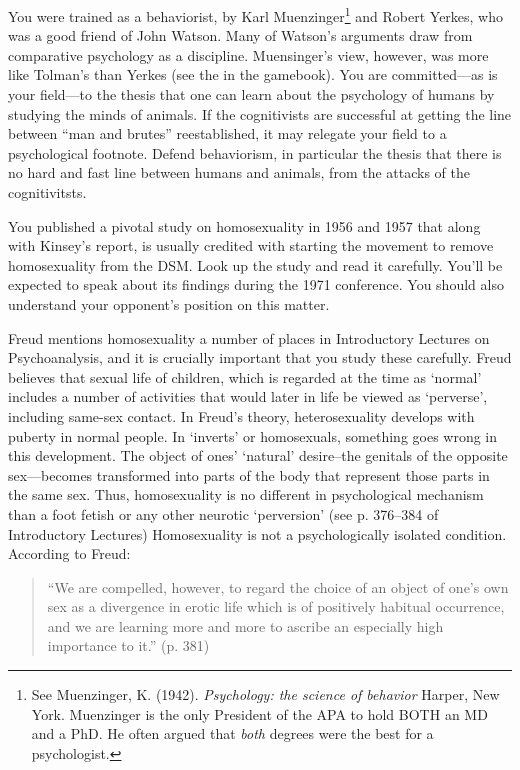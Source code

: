 \begin{refsection}
You were trained as a behaviorist, by Karl Muenzinger\footnote{See Muenzinger, K. (1942). \emph{Psychology: the science of behavior} Harper, New York. Muenzinger is the only President of the APA to hold BOTH an MD and a PhD. He often argued that \emph{both} degrees were the best for a psychologist.} and Robert Yerkes, who was a good friend of John Watson. Many of Watson's arguments draw from comparative psychology as a discipline. Muensinger's view, however, was more like Tolman's than Yerkes (see the  in the gamebook). You are committed—as is your field—to the thesis that one can learn about the psychology of humans by studying the minds of animals. If the cognitivists are successful at getting the line between “man and brutes” reestablished, it may relegate your field to a psychological footnote. Defend behaviorism, in particular the thesis that there is no hard and fast line between humans and animals, from the attacks of the cognitivitsts.

You published a pivotal study on homosexuality in 1956 and 1957 that along with Kinsey's report, is usually credited with starting the movement to remove homosexuality from the DSM. Look up the study and read it carefully. You'll be expected to speak about its findings during the 1971 conference. You should also understand your opponent's position on this matter.

Freud mentions homosexuality a number of places in Introductory Lectures on Psychoanalysis, and it is crucially important that you study these carefully. Freud believes that sexual life of children, which is regarded at the time as `normal' includes a number of activities that would later in life be viewed as `perverse', including same-sex contact. In Freud's theory, heterosexuality develops with puberty in normal people. In `inverts' or homosexuals, something goes wrong in this development. The object of ones' `natural' desire--the genitals of the opposite sex—becomes transformed into parts of the body that represent those parts in the same sex. Thus, homosexuality is no different in psychological mechanism than a foot fetish or any other neurotic `perversion' (see p. 376--384 of Introductory Lectures) Homosexuality is not a psychologically isolated condition. According to Freud:

\begin{quote}

“We are compelled, however, to regard the choice of an object of one's own sex as a divergence in erotic life which is of positively habitual occurrence, and we are learning more and more to ascribe an especially high importance to it.” (p. 381)
\end{quote}


\end{refsection}
